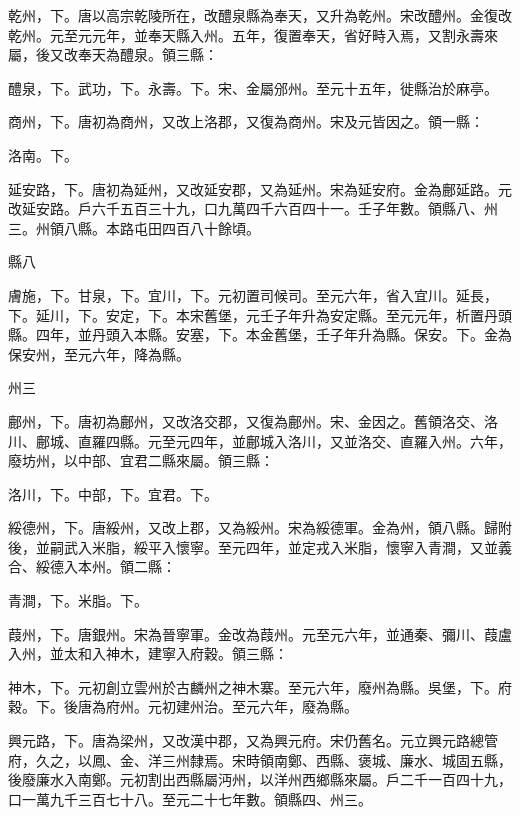 \begin{pinyinscope}
 乾州，下。唐以高宗乾陵所在，改醴泉縣為奉天，又升為乾州。宋改醴州。金復改乾州。元至元元年，並奉天縣入州。五年，復置奉天，省好畤入焉，又割永壽來屬，後又改奉天為醴泉。領三縣：



 醴泉，下。武功，下。永壽。下。宋、金屬邠州。至元十五年，徙縣治於麻亭。



 商州，下。唐初為商州，又改上洛郡，又復為商州。宋及元皆因之。領一縣：



 洛南。下。



 延安路，下。唐初為延州，又改延安郡，又為延州。宋為延安府。金為鄜延路。元改延安路。戶六千五百三十九，口九萬四千六百四十一。壬子年數。領縣八、州三。州領八縣。本路屯田四百八十餘頃。



 縣八



 膚施，下。甘泉，下。宜川，下。元初置司候司。至元六年，省入宜川。延長，下。延川，下。安定，下。本宋舊堡，元壬子年升為安定縣。至元元年，析置丹頭縣。四年，並丹頭入本縣。安塞，下。本金舊堡，壬子年升為縣。保安。下。金為保安州，至元六年，降為縣。



 州三



 鄜州，下。唐初為鄜州，又改洛交郡，又復為鄜州。宋、金因之。舊領洛交、洛川、鄜城、直羅四縣。元至元四年，並鄜城入洛川，又並洛交、直羅入州。六年，廢坊州，以中部、宜君二縣來屬。領三縣：



 洛川，下。中部，下。宜君。下。



 綏德州，下。唐綏州，又改上郡，又為綏州。宋為綏德軍。金為州，領八縣。歸附後，並嗣武入米脂，綏平入懷寧。至元四年，並定戎入米脂，懷寧入青澗，又並義合、綏德入本州。領二縣：



 青澗，下。米脂。下。



 葭州，下。唐銀州。宋為晉寧軍。金改為葭州。元至元六年，並通秦、彌川、葭盧入州，並太和入神木，建寧入府穀。領三縣：



 神木，下。元初創立雲州於古麟州之神木寨。至元六年，廢州為縣。吳堡，下。府穀。下。後唐為府州。元初建州治。至元六年，廢為縣。



 興元路，下。唐為梁州，又改漢中郡，又為興元府。宋仍舊名。元立興元路總管府，久之，以鳳、金、洋三州隸焉。宋時領南鄭、西縣、褒城、廉水、城固五縣，後廢廉水入南鄭。元初割出西縣屬沔州，以洋州西鄉縣來屬。戶二千一百四十九，口一萬九千三百七十八。至元二十七年數。領縣四、州三。




\end{pinyinscope}
